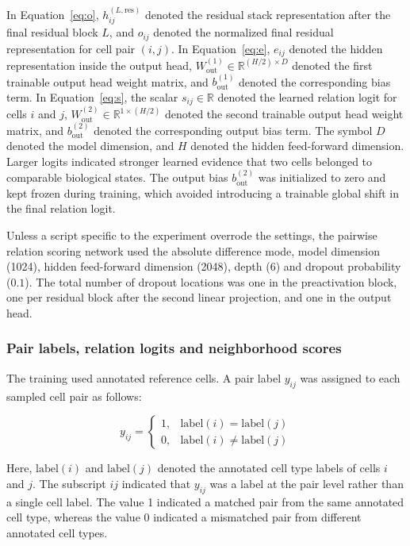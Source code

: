 \documentclass[11pt]{article}
\begin{document}
In Equation~\ref{eq:o}, $h_{ij}^{(L,\mathrm{res})}$ denoted the residual stack representation after the final residual block $L$, and $o_{ij}$ denoted the normalized final residual representation for cell pair $(i,j)$. In Equation~\ref{eq:e}, $e_{ij}$ denoted the hidden representation inside the output head, $W_{\mathrm{out}}^{(1)}\in\mathbb{R}^{(H/2)\times D}$ denoted the first trainable output head weight matrix, and $b_{\mathrm{out}}^{(1)}$ denoted the corresponding bias term. In Equation~\ref{eq:s}, the scalar $s_{ij}\in\mathbb{R}$ denoted the learned relation logit for cells $i$ and $j$, $W_{\mathrm{out}}^{(2)}\in\mathbb{R}^{1\times(H/2)}$ denoted the second trainable output head weight matrix, and $b_{\mathrm{out}}^{(2)}$ denoted the corresponding output bias term. The symbol $D$ denoted the model dimension, and $H$ denoted the hidden feed-forward dimension. Larger logits indicated stronger learned evidence that two cells belonged to comparable biological states. The output bias $b_{\mathrm{out}}^{(2)}$ was initialized to zero and kept frozen during training, which avoided introducing a trainable global shift in the final relation logit.

Unless a script specific to the experiment overrode the settings, the pairwise relation scoring network used the absolute difference mode, model dimension (1024), hidden feed-forward dimension (2048), depth (6) and dropout probability ($0.1$). The total number of dropout locations was one in the preactivation block, one per residual block after the second linear projection, and one in the output head.

\subsubsection*{Pair labels, relation logits and neighborhood scores}

The training used annotated reference cells. A pair label $y_{ij}$ was assigned to each sampled cell pair as follows:

\begin{equation}
y_{ij}=
\begin{cases}
1, & \mathrm{label}(i)=\mathrm{label}(j) \\
0, & \mathrm{label}(i)\ne\mathrm{label}(j)
\end{cases}
  \label{eq:y}
\end{equation}

Here, $\mathrm{label}(i)$ and $\mathrm{label}(j)$ denoted the annotated cell type labels of cells $i$ and $j$. The subscript $ij$ indicated that $y_{ij}$ was a label at the pair level rather than a single cell label. The value 1 indicated a matched pair from the same annotated cell type, whereas the value 0 indicated a mismatched pair from different annotated cell types.
\end{document}
